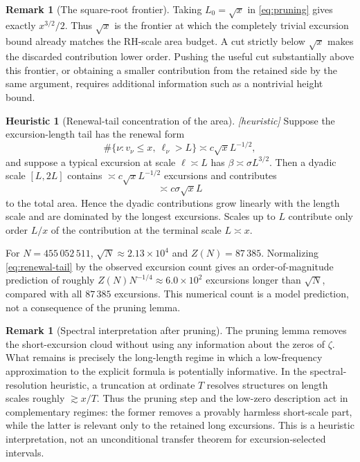 \documentclass[11pt,reqno]{amsart}
\theoremstyle{plain}
\theoremstyle{definition}
\newtheorem{remark}[theorem]{Remark}
\newtheorem{heuristic}[theorem]{Heuristic}
\begin{document}
\begin{remark}[The square-root frontier]
\label{rem:sqrt-frontier}
Taking $L_0=\sqrt{x}$ in \eqref{eq:pruning} gives exactly
$x^{3/2}/2$. Thus $\sqrt{x}$ is the frontier at which the completely
trivial excursion bound already matches the RH-scale area budget. A cut
strictly below $\sqrt{x}$ makes the discarded contribution lower order.
Pushing the useful cut substantially above this frontier, or obtaining a
smaller contribution from the retained side by the same argument, requires
additional information such as a nontrivial height bound.
\end{remark}

\begin{heuristic}[Renewal-tail concentration of the area]
\label{heu:renewal-tail}
\emph{[heuristic]} Suppose the excursion-length tail has the renewal form
\begin{equation}
\label{eq:renewal-tail}
  \#\{\nu:v_\nu\le x,\ \ell_\nu>L\}
  \asymp c\sqrt{x}L^{-1/2},
\end{equation}
and suppose a typical excursion at scale $\ell\asymp L$ has
$\beta\asymp\sigma L^{3/2}$. Then a dyadic scale $[L,2L]$ contains
$\asymp c\sqrt{x}L^{-1/2}$ excursions and contributes
\begin{equation}
\label{eq:renewal-scale-area}
  \asymp c\sigma\sqrt{x}L
\end{equation}
to the total area. Hence the dyadic contributions grow linearly with the
length scale and are dominated by the longest excursions. Scales up to
$L$ contribute only order $L/x$ of the contribution at the terminal scale
$L\asymp x$.

For $N=455\,052\,511$, $\sqrt N\approx2.13\times10^4$ and
$Z(N)=87\,385$. Normalizing \eqref{eq:renewal-tail} by the observed
excursion count gives an order-of-magnitude prediction of roughly
$Z(N)N^{-1/4}\approx6.0\times10^2$ excursions longer than $\sqrt N$,
compared with all $87\,385$ excursions. This numerical count is a model
prediction, not a consequence of the pruning lemma.
\end{heuristic}

\begin{remark}[Spectral interpretation after pruning]
\label{rem:spectral-pruning}
The pruning lemma removes the short-excursion cloud without using any
information about the zeros of $\zeta$. What remains is precisely the
long-length regime in which a low-frequency approximation to the explicit
formula is potentially informative. In the spectral-resolution heuristic,
a truncation at ordinate $T$ resolves structures on length scales roughly
$\gtrsim x/T$. Thus the pruning step and the low-zero description act in
complementary regimes: the former removes a provably harmless short-scale
part, while the latter is relevant only to the retained long excursions.
This is a heuristic interpretation, not an unconditional transfer theorem
for excursion-selected intervals.
\end{remark}
\end{document}
